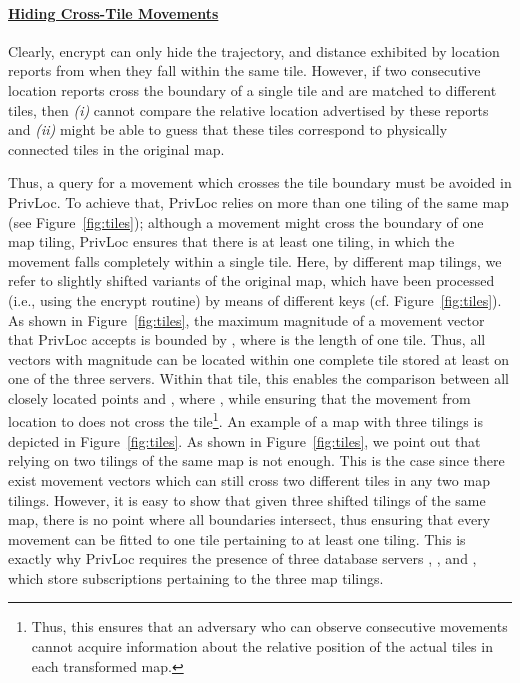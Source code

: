 \documentclass{llncs}
\newcommand\sol{{\sf PrivLoc}}
\begin{document}
\vspace{-1 em}\paragraph{\underline{Hiding Cross-Tile Movements}\\}

Clearly, {\sf encrypt} can only hide the trajectory, and distance exhibited by location reports from  when they fall within the same tile. However, if two consecutive
location reports cross the boundary of a single tile and are matched to different tiles, then \emph{(i)}  cannot compare the relative location advertised by these reports
and \emph{(ii)}  might be able to guess that these tiles correspond to physically connected tiles in the original map.

Thus, a query for a movement which crosses the tile boundary must be avoided in \sol. To achieve that, \sol{} relies on more than one tiling of the same map (see Figure~\ref{fig:tiles}); although a movement
might cross the boundary of one map tiling, \sol{} ensures that there is at least one tiling, in which the movement falls completely within a single tile. Here, by different map tilings, we refer to slightly shifted variants of the original map, which
have been processed (i.e., using the {\sf encrypt} routine) by means of different keys (cf. Figure~\ref{fig:tiles}). As shown in Figure~\ref{fig:tiles}, the maximum
magnitude of a movement vector that \sol{} accepts is bounded by , where  is the length of one tile. Thus, all vectors with magnitude  can be located within one complete tile stored at least on
one of the three servers. Within that tile, this enables the comparison between all closely located points  and , where , while ensuring that
the movement from location  to  does not cross the tile\footnote{Thus, this ensures that an adversary who can observe consecutive movements cannot acquire information about the relative position of the actual tiles in each transformed map.}.
An example of a map with three tilings is depicted in Figure~\ref{fig:tiles}. As shown in Figure~\ref{fig:tiles}, we point out that relying on two tilings of the same map is not enough. This is the case since there exist
movement vectors which can still cross two different tiles in any two map tilings. However, it is easy to show that given three shifted tilings of the same map, there is no point where all boundaries intersect, thus ensuring that every movement
can be fitted to one tile pertaining to at least one tiling. This is exactly why \sol{} requires the presence of three database servers , , and , which store subscriptions pertaining to the three map tilings.
\end{document}
